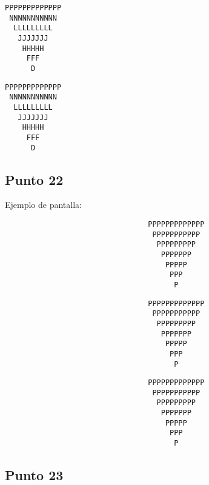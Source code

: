 \begin{lstlisting}
PPPPPPPPPPPPP
 NNNNNNNNNNN
  LLLLLLLLL
   JJJJJJJ
    HHHHH
     FFF
      D
\end{lstlisting}

\begin{lstlisting}
PPPPPPPPPPPPP
 NNNNNNNNNNN
  LLLLLLLLL
   JJJJJJJ
    HHHHH
     FFF
      D
\end{lstlisting}




\subsection{Punto 22}
	
	Ejemplo de pantalla:
\begin{lstlisting}
                                 PPPPPPPPPPPPP
                                  PPPPPPPPPPP
                                   PPPPPPPPP
                                    PPPPPPP
                                     PPPPP
                                      PPP
                                       P
\end{lstlisting}

\begin{lstlisting}
                                 PPPPPPPPPPPPP
                                  PPPPPPPPPPP
                                   PPPPPPPPP
                                    PPPPPPP
                                     PPPPP
                                      PPP
                                       P
\end{lstlisting}

\begin{lstlisting}
                                 PPPPPPPPPPPPP
                                  PPPPPPPPPPP
                                   PPPPPPPPP
                                    PPPPPPP
                                     PPPPP
                                      PPP
                                       P
\end{lstlisting}





\subsection{Punto 23}
	
